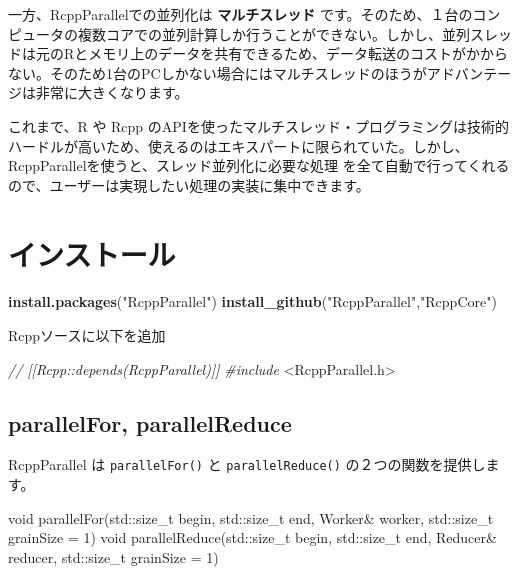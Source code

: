 \documentclass[]{book}
\newenvironment{Shaded}{\begin{snugshade}}{\end{snugshade}}
\newcommand{\BuiltInTok}[1]{#1}
\newcommand{\CommentTok}[1]{\textcolor[rgb]{0.56,0.35,0.01}{\textit{#1}}}
\newcommand{\DataTypeTok}[1]{\textcolor[rgb]{0.13,0.29,0.53}{#1}}
\newcommand{\DecValTok}[1]{\textcolor[rgb]{0.00,0.00,0.81}{#1}}
\newcommand{\ImportTok}[1]{#1}
\newcommand{\KeywordTok}[1]{\textcolor[rgb]{0.13,0.29,0.53}{\textbf{#1}}}
\newcommand{\NormalTok}[1]{#1}
\newcommand{\PreprocessorTok}[1]{\textcolor[rgb]{0.56,0.35,0.01}{\textit{#1}}}
\newcommand{\StringTok}[1]{\textcolor[rgb]{0.31,0.60,0.02}{#1}}
\begin{document}
一方、RcppParallelでの並列化は \textbf{マルチスレッド} です。そのため、１台のコンピュータの複数コアでの並列計算しか行うことができない。しかし、並列スレッドは元のRとメモリ上のデータを共有できるため、データ転送のコストがかからない。そのため1台のPCしかない場合にはマルチスレッドのほうがアドバンテージは非常に大きくなります。

これまで、R や Rcpp のAPIを使ったマルチスレッド・プログラミングは技術的ハードルが高いため、使えるのはエキスパートに限られていた。しかし、RcppParallelを使うと、スレッド並列化に必要な処理
を全て自動で行ってくれるので、ユーザーは実現したい処理の実装に集中できます。

\hypertarget{-1}{%
\section{インストール}\label{-1}}

\begin{Shaded}
\begin{Highlighting}[]
\KeywordTok{install.packages}\NormalTok{(}\StringTok{"RcppParallel"}\NormalTok{)}
\KeywordTok{install_github}\NormalTok{(}\StringTok{"RcppParallel"}\NormalTok{,}\StringTok{"RcppCore"}\NormalTok{)}
\end{Highlighting}
\end{Shaded}

Rcppソースに以下を追加

\begin{Shaded}
\begin{Highlighting}[]
\CommentTok{// [[Rcpp::depends(RcppParallel)]]}
\PreprocessorTok{#include }\ImportTok{<RcppParallel.h>}
\end{Highlighting}
\end{Shaded}

\hypertarget{parallelfor-parallelreduce}{%
\subsection{parallelFor, parallelReduce}\label{parallelfor-parallelreduce}}

RcppParallel は \texttt{parallelFor()} と \texttt{parallelReduce()} の２つの関数を提供します。

\begin{Shaded}
\begin{Highlighting}[]
\DataTypeTok{void}\NormalTok{ parallelFor(}\BuiltInTok{std::}\NormalTok{size_t begin, }\BuiltInTok{std::}\NormalTok{size_t end, }
\NormalTok{                    Worker& worker, }\BuiltInTok{std::}\NormalTok{size_t grainSize = }\DecValTok{1}\NormalTok{)}
\DataTypeTok{void}\NormalTok{ parallelReduce(}\BuiltInTok{std::}\NormalTok{size_t begin, }\BuiltInTok{std::}\NormalTok{size_t end, }
\NormalTok{                        Reducer& reducer, }\BuiltInTok{std::}\NormalTok{size_t grainSize = }\DecValTok{1}\NormalTok{)}
\end{Highlighting}
\end{Shaded}
\end{document}
